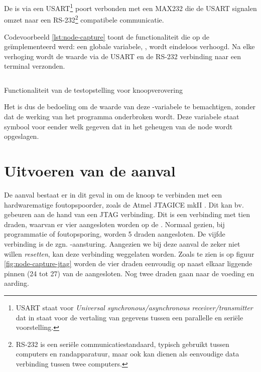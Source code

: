 De \mcu is via een USART\footnote{USART staat voor \emph{Universal
synchronous/asynchronous receiver/transmitter} dat in staat voor de vertaling
van gegevens tussen een parallelle en seri\"ele voorstelling.} poort verbonden
met een MAX232 \citep{datasheet:max232} die de USART signalen omzet naar een
RS-232\footnote{RS-232 is een seri\"ele communicatiestandaard, typisch gebruikt
tussen computers en randapparatuur, maar ook kan dienen als eenvoudige data
verbinding tussen twee computers.} compatibele communicatie.

Codevoorbeeld \ref{lst:node-capture} toont de functionaliteit die op de \mcu
ge\"implementeerd werd: een globale variabele, , wordt eindeloos
verhoogd. Na elke verhoging wordt de waarde via de USART en de RS-232
verbinding naar een terminal verzonden. 

\begin{listing}[ht]
  \inputminted[linenos,frame=lines,framesep=2mm,fontsize=\footnotesize]{c}{../src/node-capture/main.c}
  \vspace{-5mm}
  \caption{Functionaliteit van de testopstelling voor knoopverovering}
  \label{lst:node-capture}
\end{listing}

Het is dus de bedoeling om de waarde van deze -variabele te
bemachtigen, zonder dat de werking van het programma onderbroken wordt. Deze
variabele staat symbool voor eender welk gegeven dat in het geheugen van de
node wordt opgeslagen.

\vspace{-3mm}

\section{Uitvoeren van de aanval}

De aanval bestaat er in dit geval in om de knoop te verbinden met een
hardwarematige foutopspoorder, zoals de Atmel JTAGICE mkII
\citep{manual:jtagicemkii}. Dit kan bv. gebeuren aan de hand van een JTAG
verbinding. Dit is een verbinding met tien draden, waarvan er vier aangesloten
worden op de \mcu. Normaal gezien, bij programmatie of foutopsporing, worden 5
draden aangesloten. De vijfde verbinding is de zgn. -aansturing.
Aangezien we bij deze aanval de \mcu zeker niet willen \emph{resetten}, kan
deze verbinding weggelaten worden. Zoals te zien is op figuur
\ref{fig:node-capture-jtag} worden de vier draden eenvoudig op naast elkaar
liggende pinnen (24 tot 27) van de \mcu aangesloten. Nog twee draden gaan naar
de voeding en aarding.

